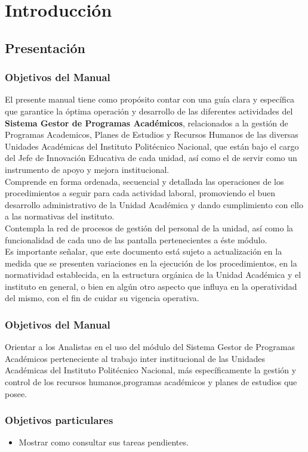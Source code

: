 \chapter{Introducción}
\section{Presentación}
\subsection{Objetivos del Manual}
El presente manual tiene como propósito contar con una guía clara y específica que garantice la óptima operación y desarrollo de las diferentes actividades del \textbf{Sistema Gestor de Programas Académicos}, relacionados a la gestión de Programas Academicos, Planes de Estudios y Recursos Humanos de las diversas Unidades Académicas del Instituto Politécnico Nacional, que están bajo el cargo del Jefe de Innovación Educativa de cada unidad, así como el de servir como un instrumento de apoyo y mejora institucional.\\

Comprende en forma ordenada, secuencial y detallada las operaciones de los procedimientos a seguir para cada actividad laboral, promoviendo el buen desarrollo administrativo de la Unidad Académica y dando cumplimiento con ello a las normativas del instituto.\\

Contempla la red de procesos de gestión del personal de la unidad, así como la funcionalidad de cada uno de las pantalla pertenecientes a éste módulo.\\

Es importante señalar, que este documento está sujeto a actualización en la medida que se presenten variaciones en la ejecución de los procedimientos, en la normatividad establecida, en la estructura orgánica de la Unidad Académica y el instituto en general, o bien en algún otro aspecto que influya en la operatividad del mismo, con el fin de cuidar su vigencia operativa.\\

    \subsection{Objetivos del Manual}
     Orientar a los Analistas en el uso del módulo del Sistema Gestor de Programas Académicos perteneciente al trabajo inter institucional de las Unidades Académicas del Instituto Politécnico Nacional, más específicamente la gestión y control de los recursos humanos,programas académicos y planes de estudios que posee.
    
    \subsection{Objetivos particulares}
    \begin{itemize}
        \item Mostrar como consultar sus tareas pendientes.
        
    \end{itemize}
